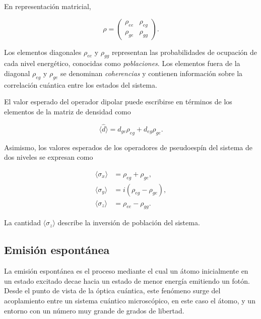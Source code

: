 \documentclass[11pt]{report}
\begin{document}
En representación matricial,

\begin{equation}
\rho =
\begin{pmatrix}
\rho_{ee} & \rho_{eg} \\
\rho_{ge} & \rho_{gg}
\end{pmatrix}.
\end{equation}

Los elementos diagonales $\rho_{ee}$ y $\rho_{gg}$ representan las probabilidades de ocupación de cada nivel energético, conocidas como \textit{poblaciones}. Los elementos fuera de la diagonal $\rho_{eg}$ y $\rho_{ge}$ se denominan \textit{coherencias} y contienen información sobre la correlación cuántica entre los estados del sistema.

El valor esperado del operador dipolar puede escribirse en términos de los elementos de la matriz de densidad como

\begin{equation}
\langle \hat{d} \rangle =
d_{ge}\rho_{eg} + d_{eg}\rho_{ge}.
\end{equation}

Asimismo, los valores esperados de los operadores de pseudoespín del sistema de dos niveles se expresan como

\begin{align}
\langle \sigma_x \rangle &= \rho_{eg} + \rho_{ge}, \\
\langle \sigma_y \rangle &= i(\rho_{eg} - \rho_{ge}), \\
\langle \sigma_z \rangle &= \rho_{ee} - \rho_{gg}.
\end{align}

La cantidad $\langle \sigma_z \rangle$ describe la inversión de población del sistema.

\subsection{Emisión espontánea}

La emisión espontánea es el proceso mediante el cual un átomo inicialmente en un estado excitado decae hacia un estado de menor energía emitiendo un fotón. Desde el punto de vista de la óptica cuántica, este fenómeno surge del acoplamiento entre un sistema cuántico microscópico, en este caso el átomo, y un entorno con un número muy grande de grados de libertad.
\end{document}
